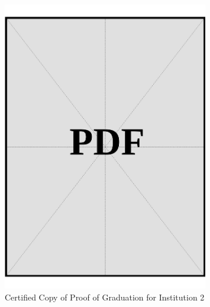 \begin{figure}[h]
    \centering
    \includegraphics[page=1, width=0.8\textwidth]{../application-docs/applicant/post-secondary-institutions/institution-2/proof-of-graduation/certified-copies.pdf}
    \caption{Certified Copy of Proof of Graduation for Institution 2}
    \label{fig:institution-2-proof-of-graduation-certified-copy}
\end{figure}

\vspace*{\fill}
\clearpage
